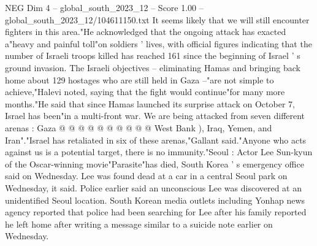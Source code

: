 \begin{textsample}{NEG Dim 4 – global\_south\_2023\_12 – Score 1.00 – global\_south\_2023\_12/104611150.txt}
It seems likely that we will still encounter fighters in this area."He acknowledged that the ongoing attack has exacted a"heavy and painful toll"on soldiers ' lives, with official figures indicating that the number of Israeli troops killed has reached 161 since the beginning of Israel ' s ground invasion.
The Israeli objectives -- eliminating Hamas and bringing back home about 129 hostages who are still held in Gaza --"are not simple to achieve,"Halevi noted, saying that the fight would continue"for many more months."He said that since Hamas launched its surprise attack on October 7, Israel has been"in a multi-front war.
We are being attacked from seven different arenas : Gaza @ @ @ @ @ @ @ @ @ @ West Bank ), Iraq, Yemen, and Iran"."Israel has retaliated in six of these arenas,"Gallant said."Anyone who acts against us is a potential target, there is no immunity."Seoul : Actor Lee Sun-kyun of the Oscar-winning movie"Parasite"has died, South Korea ' s emergency office said on Wednesday.
Lee was found dead at a car in a central Seoul park on Wednesday, it said.
Police earlier said an unconscious Lee was discovered at an unidentified Seoul location.
South Korean media outlets including Yonhap news agency reported that police had been searching for Lee after his family reported he left home after writing a message similar to a suicide note earlier on Wednesday.

\end{textsample}
